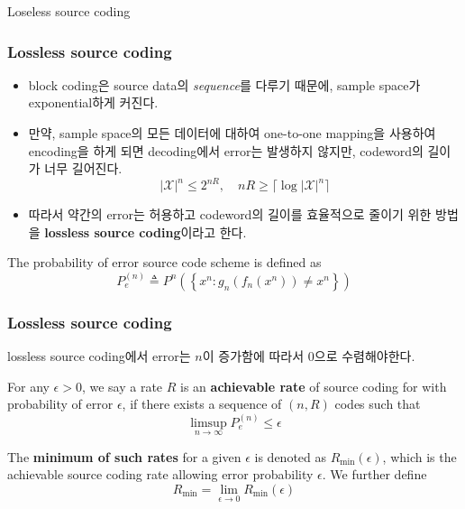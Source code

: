 \documentclass[9pt]{beamer}
\begin{document}
\begin{section}{Loseless source coding}
        \begin{frame}
            \frametitle{Lossless source coding}
            \begin{itemize}
                \item block coding은 source data의 \textit{sequence}를 다루기 때문에, sample space가 exponential하게 커진다. 
                \item 만약, sample space의 모든 데이터에 대하여 one-to-one mapping을 사용하여 encoding을 하게 되면 decoding에서 error는 발생하지 않지만, codeword의 길이가 너무 길어진다.
                $$ |\mathcal X |^n \le 2^{nR},\quad nR \ge \lceil \log |\mathcal X |^n \rceil$$
                \item 따라서 약간의 error는 허용하고 codeword의 길이를 효율적으로 줄이기 위한 방법을 \textbf{lossless source coding}이라고 한다.
            \end{itemize}
            \begin{definition}
                The probability of error source code scheme is defined as  $$ P_e^{(n)} \triangleq P^n\left(\left\{x^n: g_n\left(f_n\left(x^n\right)\right) \neq x^n\right\}\right) $$
            \end{definition}
        \end{frame}

        \begin{frame}
            \frametitle{Lossless source coding}
            lossless source coding에서 error는 $n$이 증가함에 따라서 \alert{0으로 수렴}해야한다.
            
            \begin{definition}
                For any $\epsilon>0$, we say a rate $R$ is an \textbf{achievable rate} of source coding for with probability of error $\epsilon$, if there exists a sequence of $(n, R)$ codes such that
                $$ \limsup _{n \rightarrow \infty} P_e^{(n)} \leq \epsilon $$
            \end{definition}

            \begin{definition}
                The \textbf{minimum of such rates} for a given $\epsilon$ is denoted as $R_{\min}(\epsilon)$, which is the achievable source coding rate allowing error probability $\epsilon$. We further define 
                $$ R_{\min }=\lim _{\epsilon \rightarrow 0} R_{\min }(\epsilon) $$
            \end{definition}
        \end{frame}



\end{section}
\end{document}
